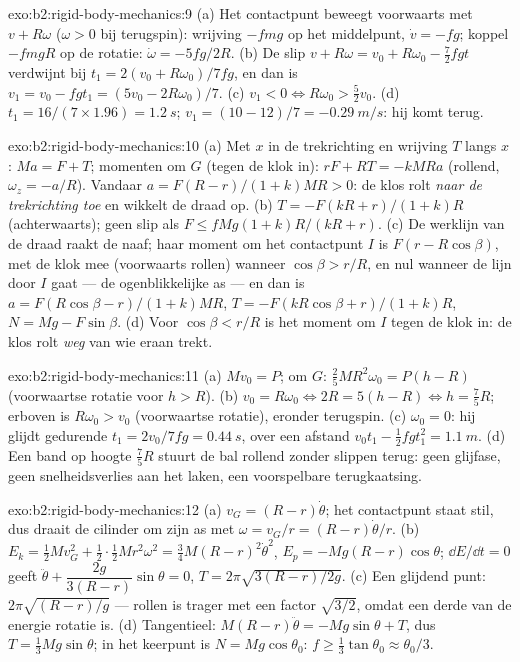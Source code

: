 \begin{solution}{exo:b2:rigid-body-mechanics:9}
(a) Het contactpunt beweegt voorwaarts met $v + R\omega$ ($\omega > 0$ bij
terugspin): wrijving $-fmg$ op het middelpunt, $\dot v = -fg$; koppel
$-fmgR$ op de rotatie: $\dot\omega = -5fg/2R$. (b) De slip
$v + R\omega = v_0 +
R\omega_0 - \tfrac72fgt$ verdwijnt bij
$t_1 = 2(v_0 + R\omega_0)/7fg$, en dan is
$v_1
= v_0 - fgt_1 = (5v_0 - 2R\omega_0)/7$. (c)
$v_1 < 0 \iff R\omega_0 > \tfrac52v_0$. (d)
$t_1 = 16/(7 \times 1.96) = \qty{1.2}{s}$;
$v_1 = (10 - 12)/7 = \qty{-0.29}{m/s}$: hij komt terug.
\end{solution}

\begin{solution}{exo:b2:rigid-body-mechanics:10}
(a) Met $x$ in de trekrichting en wrijving $T$ langs $x$: $Ma = F + T$;
momenten om $G$ (tegen de klok in): $rF + RT = -kMRa$ (rollend,
$\omega_z
= -a/R$). Vandaar $a = F(R - r)/(1 + k)MR > 0$: de klos rolt
\emph{naar de trekrichting toe} en wikkelt de draad op. (b)
$T = -F(kR + r)/(1 +
k)R$ (achterwaarts); geen slip als
$F \le fMg(1 + k)R/(kR + r)$. (c) De werklijn van de draad raakt de naaf;
haar moment om het contactpunt $I$ is $F(r - R\cos\beta)$, met de klok mee
(voorwaarts rollen) wanneer $\cos\beta >
r/R$, en nul wanneer de lijn door
$I$ gaat --- de ogenblikkelijke as --- en dan is
$a = F(R\cos\beta - r)/(1 + k)MR$, $T = -F(kR\cos\beta + r)/(1 + k)R$,
$N = Mg - F\sin\beta$. (d) Voor $\cos\beta < r/R$ is het moment om $I$ tegen
de klok in: de klos rolt \emph{weg} van wie eraan trekt.
\end{solution}

\begin{solution}{exo:b2:rigid-body-mechanics:11}
(a) $Mv_0 = P$; om $G$: $\tfrac25MR^2\omega_0 = P(h - R)$ (voorwaartse
rotatie voor $h > R$). (b)
$v_0 = R\omega_0 \iff 2R = 5(h - R) \iff h = \tfrac75R$; erboven is
$R\omega_0 > v_0$ (voorwaartse rotatie), eronder terugspin. (c)
$\omega_0 = 0$: hij glijdt gedurende $t_1 = 2v_0/7fg = \qty{0.44}{s}$, over
een afstand $v_0t_1 -
\tfrac12fgt_1^2 = \qty{1.1}{m}$. (d) Een band op
hoogte $\tfrac75R$ stuurt de bal rollend zonder slippen terug: geen
glijfase, geen snelheidsverlies aan het laken, een voorspelbare
terugkaatsing.
\end{solution}

\begin{solution}{exo:b2:rigid-body-mechanics:12}
(a) $v_G = (R - r)\dot\theta$; het contactpunt staat stil, dus draait de
cilinder om zijn as met $\omega = v_G/r = (R - r)\dot\theta/r$. (b)
$E_k = \tfrac12Mv_G^2 + \tfrac12\cdot\tfrac12Mr^2\omega^2 = \tfrac34M(R - r)^2
\dot\theta^2$,
$E_p = -Mg(R - r)\cos\theta$; $\dd E/\dd t = 0$ geeft
$\ddot\theta
+ \dfrac{2g}{3(R - r)}\sin\theta = 0$,
$T = 2\pi\sqrt{3(R - r)/2g}$. (c) Een glijdend punt: $2\pi\sqrt{(R - r)/g}$
--- rollen is trager met een factor $\sqrt{3/2}$, omdat een derde van de
energie rotatie is. (d) Tangentieel:
$M(R - r)\ddot\theta =
-Mg\sin\theta + T$, dus $T = \tfrac13Mg\sin\theta$;
in het keerpunt is $N = Mg\cos\theta_0$:
$f \ge \tfrac13\tan\theta_0 \approx \theta_0/3$.
\end{solution}

